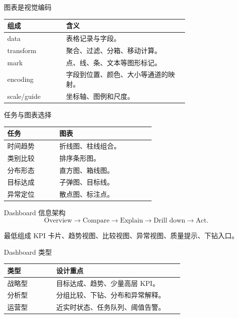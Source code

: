 \documentclass[UTF8,fontset=fandol,aspectratio=169,11pt]{ctexbeamer}
\begin{document}
\begin{frame}{图表是视觉编码}
\begin{table}
\small
\centering
\begin{tabular}{p{0.24\linewidth}p{0.50\linewidth}}
\toprule
组成 & 含义\\
\midrule
data & 表格记录与字段。\\
transform & 聚合、过滤、分箱、移动计算。\\
mark & 点、线、条、文本等图形标记。\\
encoding & 字段到位置、颜色、大小等通道的映射。\\
scale/guide & 坐标轴、图例和尺度。\\
\bottomrule
\end{tabular}
\end{table}
\end{frame}

\begin{frame}{任务与图表选择}
\begin{table}
\small
\centering
\begin{tabular}{p{0.25\linewidth}p{0.46\linewidth}}
\toprule
任务 & 图表\\
\midrule
时间趋势 & 折线图、柱线组合。\\
类别比较 & 排序条形图。\\
分布形态 & 直方图、箱线图。\\
目标达成 & 子弹图、目标线。\\
异常定位 & 散点图、标注点。\\
\bottomrule
\end{tabular}
\end{table}
\end{frame}

\begin{frame}{Dashboard 信息架构}
\[
\text{Overview}
\rightarrow
\text{Compare}
\rightarrow
\text{Explain}
\rightarrow
\text{Drill down}
\rightarrow
\text{Act}.
\]

\begin{block}{最低组成}
KPI 卡片、趋势视图、比较视图、异常视图、质量提示、下钻入口。
\end{block}
\end{frame}

\begin{frame}{Dashboard 类型}
\begin{table}
\small
\centering
\begin{tabular}{p{0.20\linewidth}p{0.52\linewidth}}
\toprule
类型 & 设计重点\\
\midrule
战略型 & 目标达成、趋势、少量高层 KPI。\\
分析型 & 分组比较、下钻、分布和异常解释。\\
运营型 & 近实时状态、任务队列、阈值告警。\\
\bottomrule
\end{tabular}
\end{table}
\end{frame}
\end{document}
